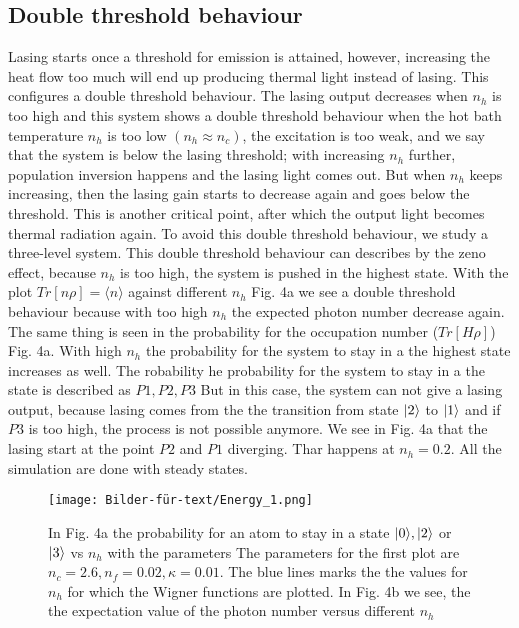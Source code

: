 \documentclass[12pt,a4paper]{article}
\DeclarePairedDelimiter\ket{\lvert}{\rangle}
\begin{document}
\subsection{Double threshold behaviour}
Lasing starts once a threshold for emission is attained, however, increasing the heat flow too much will end up producing  thermal light instead of lasing. This configures a double threshold behaviour.
The lasing output decreases when $n_h$ is too high and this system shows a double threshold behaviour when the hot bath temperature $n_h$ is too low $(n_h \approx n_c)$, the excitation is too weak, and we say that the system
is below the lasing threshold; with increasing $n_h$ further, population inversion happens and the lasing light comes out. But when $n_h$ keeps increasing, then the lasing gain starts to decrease again and goes below the threshold. This is another critical point, after which the output light becomes thermal radiation again.
To avoid this double threshold behaviour, we study a three-level system.
This double threshold behaviour can describes by the zeno effect, because $n_h$ is too high, the system is pushed  in the highest state.
With the plot  $Tr[n\rho] =\langle n\rangle$ against different $n_h$ Fig. 4a we see a  double threshold behaviour because with too high $n_h$ the expected photon number decrease again. The same thing is seen in the probability for the occupation number ($Tr[H \rho]$) Fig. 4a.  With high $n_h$ the probability for the system to stay in a the highest state increases as well. The robability he probability for the system to stay in a the state is described as $P1,P2,P3$  But in this case, the system can not give a lasing output, because lasing comes from the the transition from state $\ket{2}$ to $\ket{1}$ and if $P3$ is too high, the process is not possible anymore.  We see in Fig. 4a that the lasing start at the point $P2$ and $P1$ diverging. Thar happens at $n_h=0.2$.
All the simulation are done with steady states.
\begin{figure}[h!]
\hspace{-1cm}
\texttt{[image: Bilder-für-text/Energy\_1.png]}
\caption{In Fig. 4a the probability for an atom to stay in a state $\ket{0}, \ket{2}$ or $\ket{3}$ vs $n_h$ with the parameters The parameters for the first plot are $n_c=2.6 ,n_f=0.02,\kappa=0.01 $. The blue lines marks the the values for $ n_h$ for which the Wigner functions are plotted. In Fig. 4b we see, the the expectation value of the photon number versus different $n_h$ }
\end{figure}
\end{document}
